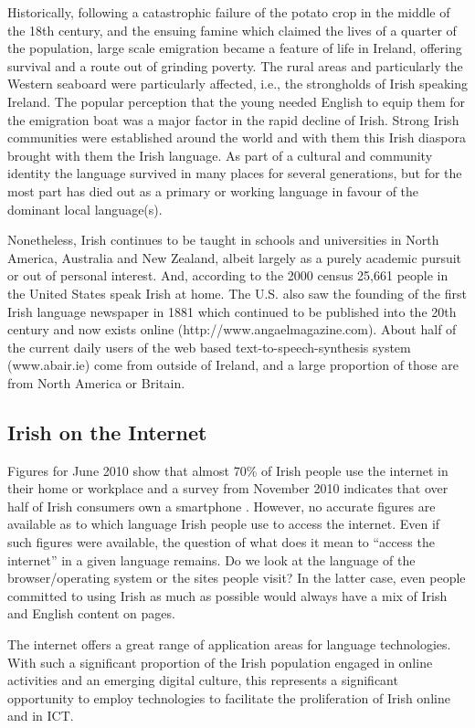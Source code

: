 \begin{multicols}{2}
Historically, following a catastrophic failure of the potato crop in the middle of the 18th century, and the ensuing famine which claimed the lives of a quarter of the population, large scale emigration became a feature of life in Ireland, offering survival and a route out of grinding poverty. The rural areas and particularly the Western seaboard were particularly affected, i.e., the strongholds of Irish speaking Ireland.  The popular perception that the young needed English to equip them for the emigration boat was a major factor in the rapid decline of Irish. Strong Irish communities were established around the world and with them this Irish diaspora brought with them the Irish language. As part of a cultural and community identity the language survived in many places for several generations, but for the most part has died out as a primary or working language in favour of the dominant local language(s). 

Nonetheless, Irish continues to be taught in schools and universities in North America, Australia and New Zealand, albeit largely as a purely academic pursuit or out of personal interest. And, according to the 2000 census 25,661 people in the United States speak Irish at home. The U.S. also saw the founding of the first Irish language newspaper in 1881 which continued to be published into the 20th century and now exists online (http://www.angaelmagazine.com). About half of the current daily users of the web based text-to-speech-synthesis system (www.abair.ie) come from outside of Ireland, and a large proportion of those are from North America or Britain.

\subsection{Irish on the Internet}
Figures for June 2010 show that almost 70\% of Irish people use the internet in their home or workplace \cite{internetstats} and a survey from November 2010 indicates that over half of Irish consumers own a smartphone \cite{mindshare}. However, no accurate figures are available as to which language Irish people use to access the internet. Even if such figures were available, the question of what does it mean to ``access the internet'' in a given language remains. Do we look at the language of the browser/operating system or the sites people visit? In the latter case, even people committed to using Irish as much as possible would always have a mix of Irish and English content on pages.

The internet offers a great range of application areas for language technologies. With such a significant proportion of the Irish population engaged in online activities and an emerging digital culture, this represents a significant opportunity to employ technologies to facilitate the proliferation of Irish online and in ICT.


\end{multicols}
